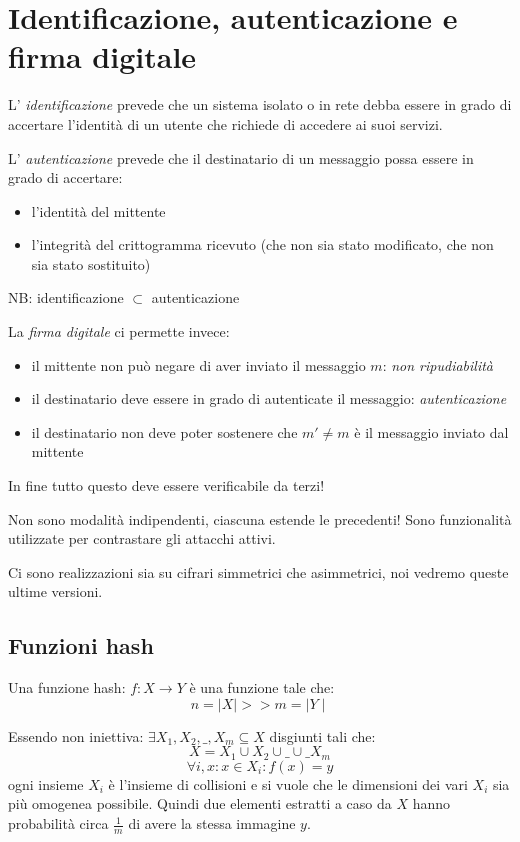 \section{Identificazione, autenticazione e firma digitale}

L' \emph{identificazione} prevede che un sistema isolato o in rete debba essere in grado di accertare l'identità di un utente che richiede di accedere ai suoi servizi.

L' \emph{autenticazione} prevede che il destinatario di un messaggio possa essere in grado di accertare:
\begin{itemize}
    \item l'identità del mittente
    \item l'integrità del crittogramma ricevuto (che non sia stato modificato, che non sia stato sostituito)
\end{itemize}

NB: identificazione $\subset$ autenticazione

La \emph{firma digitale} ci permette invece:
\begin{itemize}
    \item il mittente non può negare di aver inviato il messaggio $m$: \emph{non ripudiabilità}
    \item il destinatario deve essere in grado di autenticate il messaggio: \emph{autenticazione}
    \item il destinatario non deve poter sostenere che $m' \neq m$ è il messaggio inviato dal mittente
\end{itemize}
In fine tutto questo deve essere verificabile da terzi!

Non sono modalità indipendenti, ciascuna estende le precedenti!
Sono funzionalità utilizzate per contrastare gli attacchi attivi.

Ci sono realizzazioni sia su cifrari simmetrici che asimmetrici, noi vedremo queste ultime versioni.

\subsection{Funzioni hash}
Una funzione hash: $f: X \xrightarrow{} Y$ è una funzione tale che:
$$ n = \mid X \mid >> m = \mid Y \mid $$

Essendo non iniettiva: $ \exists X_1, X_2, \_, X_m \subseteq X$ disgiunti tali che: 
$$ X = X_1 \cup X_2 \cup \_ \cup \_ X_m $$
$$ \forall i, x : x \in X_i : f(x) = y $$
ogni insieme $X_i$ è l'insieme di collisioni e si vuole che le dimensioni dei vari $X_i$ sia più omogenea possibile.
Quindi due elementi estratti a caso da $X$ hanno probabilità circa $\frac{1}{m}$ di avere la stessa immagine $y$.


